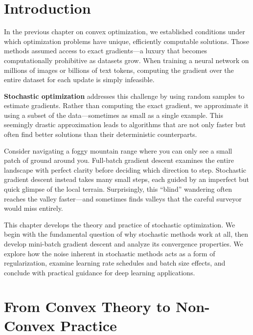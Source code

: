 \documentclass[../../main.tex]{subfiles}
\begin{document}
\section{Introduction}
\label{sec:ch10-intro}

In the previous chapter on convex optimization, we established conditions under which optimization problems have unique, efficiently computable solutions. Those methods assumed access to exact gradients---a luxury that becomes computationally prohibitive as datasets grow. When training a neural network on millions of images or billions of text tokens, computing the gradient over the entire dataset for each update is simply infeasible.

\textbf{Stochastic optimization} addresses this challenge by using random samples to estimate gradients. Rather than computing the exact gradient, we approximate it using a subset of the data---sometimes as small as a single example. This seemingly drastic approximation leads to algorithms that are not only faster but often find better solutions than their deterministic counterparts.

\begin{intuition}
Consider navigating a foggy mountain range where you can only see a small patch of ground around you. Full-batch gradient descent examines the entire landscape with perfect clarity before deciding which direction to step. Stochastic gradient descent instead takes many small steps, each guided by an imperfect but quick glimpse of the local terrain. Surprisingly, this ``blind'' wandering often reaches the valley faster---and sometimes finds valleys that the careful surveyor would miss entirely.
\end{intuition}

This chapter develops the theory and practice of stochastic optimization. We begin with the fundamental question of why stochastic methods work at all, then develop mini-batch gradient descent and analyze its convergence properties. We explore how the noise inherent in stochastic methods acts as a form of regularization, examine learning rate schedules and batch size effects, and conclude with practical guidance for deep learning applications.

\section{From Convex Theory to Non-Convex Practice}
\label{sec:ch10-convex-to-nonconvex}
\end{document}
